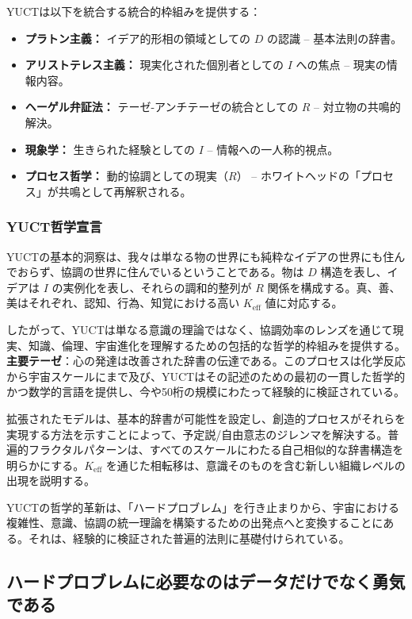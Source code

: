 \documentclass[12pt,a4paper]{article}
\newcommand{\eff}{\mathrm{eff}}
\newcommand{\Ke}{K_{\eff}}
\begin{document}
	YUCTは以下を統合する統合的枠組みを提供する：
	\begin{itemize}
		\item \textbf{プラトン主義：} イデア的形相の領域としての \(D\) の認識 – 基本法則の辞書。
		\item \textbf{アリストテレス主義：} 現実化された個別者としての \(I\) への焦点 – 現実の情報内容。
		\item \textbf{ヘーゲル弁証法：} テーゼ-アンチテーゼの統合としての \(R\) – 対立物の共鳴的解決。
		\item \textbf{現象学：} 生きられた経験としての \(I\) – 情報への一人称的視点。
		\item \textbf{プロセス哲学：} 動的協調としての現実（\(R\)） – ホワイトヘッドの「プロセス」が共鳴として再解釈される。
	\end{itemize}
	
	\subsubsection{YUCT哲学宣言}
	
	YUCTの基本的洞察は、我々は単なる物の世界にも純粋なイデアの世界にも住んでおらず、協調の世界に住んでいるということである。物は \(D\) 構造を表し、イデアは \(I\) の実例化を表し、それらの調和的整列が \(R\) 関係を構成する。真、善、美はそれぞれ、認知、行為、知覚における高い \(\Ke\) 値に対応する。
	
	したがって、YUCTは単なる意識の理論ではなく、協調効率のレンズを通じて現実、知識、倫理、宇宙進化を理解するための包括的な哲学的枠組みを提供する。
	\textbf{主要テーゼ}：心の発達は改善された辞書の伝達である。このプロセスは化学反応から宇宙スケールにまで及び、YUCTはその記述のための最初の一貫した哲学的かつ数学的言語を提供し、今や50桁の規模にわたって経験的に検証されている。
	
	拡張されたモデルは、基本的辞書が可能性を設定し、創造的プロセスがそれらを実現する方法を示すことによって、予定説/自由意志のジレンマを解決する。普遍的フラクタルパターンは、すべてのスケールにわたる自己相似的な辞書構造を明らかにする。\(\Ke\) を通じた相転移は、意識そのものを含む新しい組織レベルの出現を説明する。
	
	YUCTの哲学的革新は、「ハードプロブレム」を行き止まりから、宇宙における複雑性、意識、協調の統一理論を構築するための出発点へと変換することにある。それは、経験的に検証された普遍的法則に基礎付けられている。
	
	\subsection{ハードプロブレムに必要なのはデータだけでなく勇気である}
	\label{subsec:courage-consciousness}
	
\end{document}
